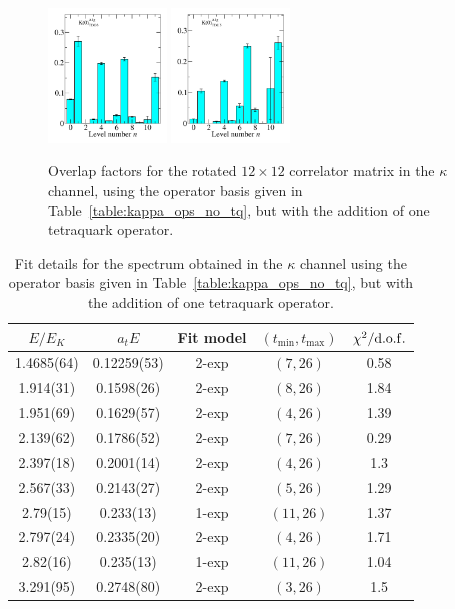 \begin{figure}
  \includegraphics[width=0.28\textwidth]{figures/spectrum_a1g/with_tq/zfactors/zfactor_kaon-P000-A1g_1-TDO_3.pdf}
  \includegraphics[width=0.28\textwidth]{figures/spectrum_a1g/with_tq/zfactors/zfactor_kaon-P000-A1g_1-TDU_5.pdf}
  \caption{Overlap factors for the rotated $12\times 12$ correlator matrix in the $\kappa$ channel, using the operator basis given in Table~\ref{table:kappa_ops_no_tq}, but with the addition of one tetraquark operator.}
  \label{fig:kappa_with_tq_zfactors}
\end{figure}

\begin{table}
  \centering
  \begin{tabular}{c|c|c|c|c}
    $E / E_K$ & $a_t E$ & Fit model & $(t_{\mathrm{min}}, {t_\mathrm{max}})$ & $\chi^2 / \rm{d.o.f.}$\\
    \hline
    1.4685(64)&0.12259(53)&2{-}exp&$(7, 26)$&0.58\\
    1.914(31)&0.1598(26)&2{-}exp&$(8, 26)$&1.84\\
    1.951(69)&0.1629(57)&2{-}exp&$(4, 26)$&1.39\\
    2.139(62)&0.1786(52)&2{-}exp&$(7, 26)$&0.29\\
    2.397(18)&0.2001(14)&2{-}exp&$(4, 26)$&1.3\\
    2.567(33)&0.2143(27)&2{-}exp&$(5, 26)$&1.29\\
    2.79(15)&0.233(13)&1{-}exp&$(11, 26)$&1.37\\
    2.797(24)&0.2335(20)&2{-}exp&$(4, 26)$&1.71\\
    2.82(16)&0.235(13)&1{-}exp&$(11, 26)$&1.04\\
    3.291(95)&0.2748(80)&2{-}exp&$(3, 26)$&1.5
  \end{tabular}
  \caption{Fit details for the spectrum obtained in the $\kappa$ channel using the operator basis given in Table~\ref{table:kappa_ops_no_tq}, but with the addition of one tetraquark operator.}
  \label{table:kappa_with_tq_spectrum}
\end{table}

